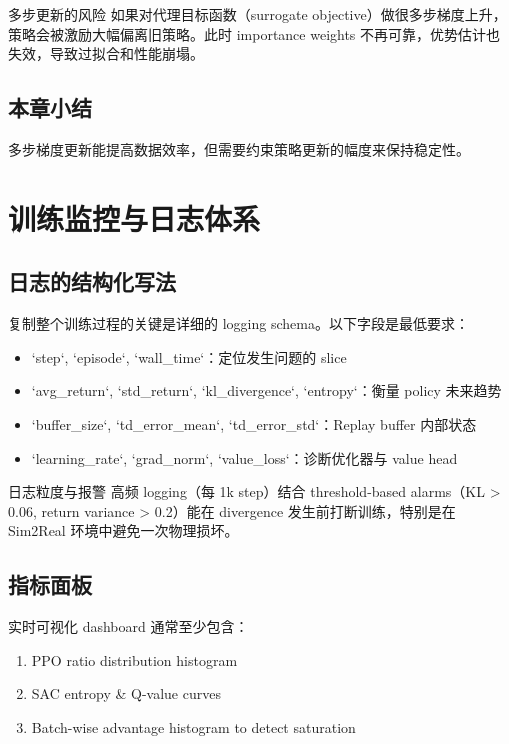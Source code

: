 \documentclass[a4paper]{article}
\begin{document}
\begin{warningbox}{多步更新的风险}
如果对代理目标函数（surrogate objective）做很多步梯度上升，策略会被激励大幅偏离旧策略。此时 importance weights 不再可靠，优势估计也失效，导致过拟合和性能崩塌。
\end{warningbox}

\subsection{本章小结}

多步梯度更新能提高数据效率，但需要约束策略更新的幅度来保持稳定性。

\section{训练监控与日志体系}

\subsection{日志的结构化写法}

复制整个训练过程的关键是详细的 logging schema。以下字段是最低要求：

\begin{itemize}
    \item `step`, `episode`, `wall_time`：定位发生问题的 slice
    \item `avg_return`, `std_return`, `kl_divergence`, `entropy`：衡量 policy 未来趋势
    \item `buffer_size`, `td_error_mean`, `td_error_std`：Replay buffer 内部状态
    \item `learning_rate`, `grad_norm`, `value_loss`：诊断优化器与 value head
\end{itemize}

\begin{importantbox}{日志粒度与报警}
高频 logging（每 1k step）结合 threshold-based alarms（KL > 0.06, return variance > 0.2）能在 divergence 发生前打断训练，特别是在 Sim2Real 环境中避免一次物理损坏。
\end{importantbox}

\subsection{指标面板}

实时可视化 dashboard 通常至少包含：

\begin{enumerate}
    \item PPO ratio distribution histogram
    \item SAC entropy & Q-value curves
    \item Batch-wise advantage histogram to detect saturation
\end{enumerate}
\end{document}
